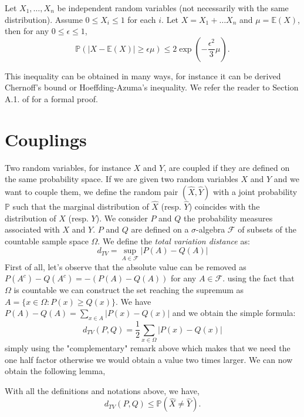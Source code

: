 \begin{theorem}\label{chernoff3}
	Let $X_1, \ldots, X_n$ be independent random variables (not necessarily with the same distribution).
	Assume $0 \leq X_i \leq 1$ for each $i$.
	Let $X = X_1 + \ldots X_n$ and $\mu = \mathbb{E}(X)$,
	then for any $0 \leq \epsilon \leq 1$,
	\begin{equation}
		\mathbb{P}( |X - \mathbb{E}(X)| \geq \epsilon \mu ) \leq 2\exp(-\frac{\epsilon^2}{3}\mu).
	\end{equation}
\end{theorem}
This inequality can be obtained in many ways, for instance it can be derived Chernoff's bound or Hoeffding-Azuma's inequality.
We refer the reader to Section A.1. of \cite{Alon16} for a formal proof.
\section{Couplings}
Two random variables, for instance $X$ and $Y$, are coupled if they are defined on the same probability space.
If we are given two random variables $X$ and $Y$ and we want to couple them, we define the random pair $(\hat{X}, \hat{Y})$ with a joint probability $\mathbb{P}$ 
such that the marginal distribution of $\hat{X}$ (resp. $\hat{Y}$) coincides with the distribution of $X$ (resp. $Y$).
We consider $P$ and $Q$ the probability measures associated with $X$ and $Y$.
$P$ and $Q$ are defined on a $\sigma$-algebra $\mathcal{F}$ of subsets of the countable sample space $\Omega$.
We define the \emph{total variation distance} as:
\begin{equation}
	d_{TV} = \sup_{A \in \mathcal{F}} |P(A) - Q(A)|
\end{equation}
First of all, let's observe that the absolute value can be removed as $P(A^c) - Q(A^c) = -(P(A) - Q(A))$ for any $A \in \mathcal{F}$.
using the fact that $\Omega$ is countable we can construct the set reaching the supremum as $A = \{x\in \Omega: P(x) \geq Q(x)\}$.
We have $P(A) - Q(A) = \sum_{x \in A} |P(x) - Q(x)|$
and we obtain the simple formula:
\begin{equation}
	d_{TV}(P, Q) = \frac{1}{2} \sum_{x \in \Omega} |P(x) - Q(x)|
\end{equation}
simply using the "complementary" remark above which makes that we need the one half factor otherwise we would obtain a value two times larger.
We can now obtain the following lemma,
\begin{lemma}\label{th:coupIneq}
	With all the definitions and notations above, we have,
	\begin{equation}
		d_{TV}(P, Q) \leq \mathbb{P}(\hat{X} \neq \hat{Y}).
	\end{equation}
\end{lemma}
